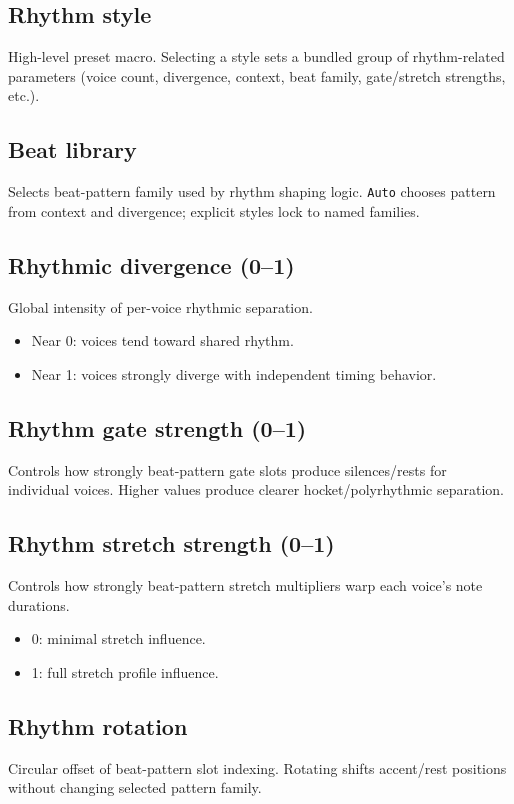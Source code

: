 \documentclass[11pt,a4paper]{article}
\begin{document}
\subsection*{Rhythm style}
High-level preset macro. Selecting a style sets a bundled group of rhythm-related parameters (voice count, divergence, context, beat family, gate/stretch strengths, etc.).

\subsection*{Beat library}
Selects beat-pattern family used by rhythm shaping logic. \texttt{Auto} chooses pattern from context and divergence; explicit styles lock to named families.

\subsection*{Rhythmic divergence (0--1)}
Global intensity of per-voice rhythmic separation.
\begin{itemize}
  \item Near 0: voices tend toward shared rhythm.
  \item Near 1: voices strongly diverge with independent timing behavior.
\end{itemize}

\subsection*{Rhythm gate strength (0--1)}
Controls how strongly beat-pattern gate slots produce silences/rests for individual voices. Higher values produce clearer hocket/polyrhythmic separation.

\subsection*{Rhythm stretch strength (0--1)}
Controls how strongly beat-pattern stretch multipliers warp each voice's note durations.
\begin{itemize}
  \item 0: minimal stretch influence.
  \item 1: full stretch profile influence.
\end{itemize}

\subsection*{Rhythm rotation}
Circular offset of beat-pattern slot indexing. Rotating shifts accent/rest positions without changing selected pattern family.
\end{document}
